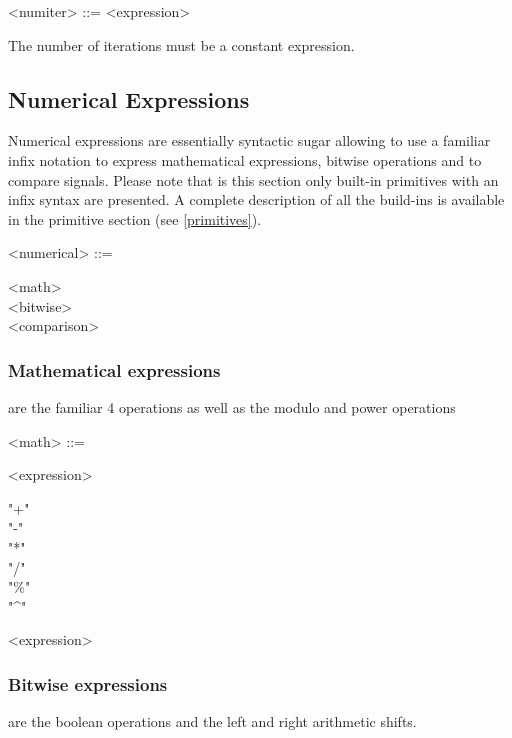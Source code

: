 \documentclass[a4paper]{book}
\begin{document}
       
\begin{grammar}
  <numiter> ::= <expression>
\end{grammar}

The number of iterations must be a constant expression. 


\subsection{Numerical Expressions}

Numerical expressions are essentially syntactic sugar allowing to use a familiar infix notation to express mathematical expressions, bitwise operations and to compare signals. Please note that is this section only built-in primitives with an infix syntax are presented. A complete description of all the build-ins is available in the primitive section (see \ref{primitives}). 

\begin{grammar}
  <numerical> ::= 
  \begin{syntdiag}
    \begin{stack}
      <math>\\
      <bitwise>\\
      <comparison>
    \end{stack}
  \end{syntdiag}
\end{grammar}

\subsubsection{Mathematical expressions} are the familiar 4 operations as well as the modulo and power operations

\begin{grammar}
  <math> ::= 
  \begin{syntdiag}
    <expression>
    \begin{stack}
      "+" \\ "-" \\ "*" \\ "/" \\ "\%" \\ "^"
    \end{stack}
    <expression>
  \end{syntdiag}
\end{grammar}

\subsubsection{Bitwise expressions} are the boolean operations and the left and right arithmetic shifts.
\end{document}
